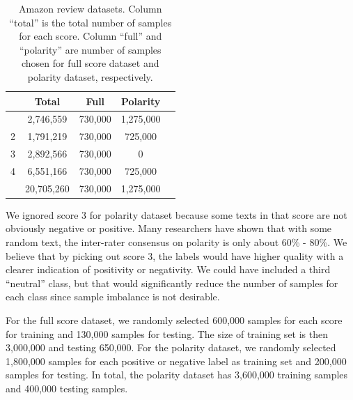 \documentclass{article}
\begin{document}
\begin{CJK}{UTF8}{gbsn}
\begin{table}[ht]
  \caption{Amazon review datasets. Column ``total'' is the total number of samples for each score. Column ``full'' and ``polarity'' are number of samples chosen for full score dataset and polarity dataset, respectively.}
  \label{tab:amzd}
  \begin{center}
    \begin{tabular}{ccccc}
      \hline
      \abovespace\belowspace
       & Total & Full & Polarity  \\
      \hline
      \abovespace
      1 & 2,746,559 & 730,000 & 1,275,000 \\
      2 & 1,791,219 & 730,000 & 725,000 \\
      3 & 2,892,566 & 730,000 & 0 \\
      4 & 6,551,166 & 730,000 & 725,000 \\
      \belowspace
      5 & 20,705,260 & 730,000 & 1,275,000 \\
      \hline
    \end{tabular}
  \end{center}
\end{table}


We ignored score 3 for polarity dataset because some texts in that score are not obviously negative or positive. Many researchers have shown that with some random text, the inter-rater consensus on polarity is only about 60\% - 80\%\cite{GA05}\cite{KH04}\cite{SM08}\cite{VG60}\cite{WWB01}\cite{WWH05}. We believe that by picking out score 3, the labels would have higher quality with a clearer indication of positivity or negativity. We could have included a third ``neutral'' class, but that would significantly reduce the number of samples for each class since sample imbalance is not desirable.

For the full score dataset, we randomly selected 600,000 samples for each score for training and 130,000 samples for testing. The size of training set is then 3,000,000 and testing 650,000. For the polarity dataset, we randomly selected 1,800,000 samples for each positive or negative label as training set and 200,000 samples for testing. In total, the polarity dataset has 3,600,000 training samples and 400,000 testing samples.


\end{CJK}
\end{document}
